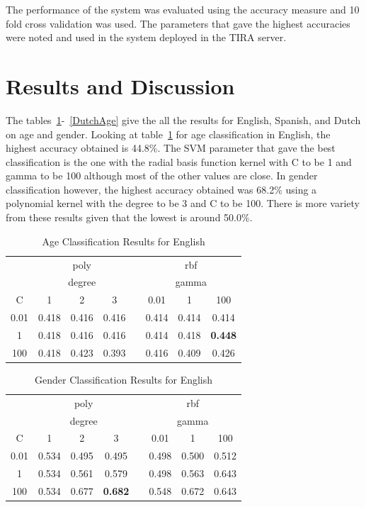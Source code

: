 \documentclass{llncs}
\begin{document}
The performance of the system was evaluated using the accuracy measure and 10 fold cross validation was used. The parameters that gave the highest accuracies were noted and used in the system deployed in the TIRA server. 

\section{Results and Discussion}
The tables~\ref{EnglishAge}-~\ref{DutchAge} give the all the results for English, Spanish, and Dutch on age and gender. Looking at table~\ref{EnglishAge} for age classification in English, the highest accuracy obtained is 44.8\%. The SVM parameter that gave the best classification is the one with the radial basis function kernel with C to be 1 and gamma to be 100 although most of the other values are close. In gender classification however, the highest accuracy obtained was 68.2\% using a polynomial kernel with the degree to be 3 and C to be 100. There is more variety from these results given that the lowest is around 50.0\%.
\begin{table}[!htbp]
\centering
\caption{Age Classification Results for English}
\label{EnglishAge}
\begin{tabular}{cccccccc}
\toprule
     & \multicolumn{3}{c}{poly}   &  & \multicolumn{3}{c}{rbf}        \\
     & \multicolumn{3}{c}{degree} &  & \multicolumn{3}{c}{gamma}      \\
C    & 1       & 2       & 3      &  & 0.01  & 1     & 100            \\
\midrule
0.01 & 0.418   & 0.416   & 0.416  &  & 0.414 & 0.414 & 0.414          \\
1    & 0.418   & 0.416   & 0.416  &  & 0.414 & 0.418 & \textbf{0.448} \\
100  & 0.418   & 0.423   & 0.393  &  & 0.416 & 0.409 & 0.426         \\
\bottomrule 
\end{tabular}
\end{table}

\begin{table}[!htbp]
\centering
\caption{Gender Classification Results for English}
\label{EnglishGender}
\begin{tabular}{cccccccc}
\toprule
     & \multicolumn{3}{c}{poly}       &  & \multicolumn{3}{c}{rbf}   \\
     & \multicolumn{3}{c}{degree}     &  & \multicolumn{3}{c}{gamma} \\
C    & 1     & 2     & 3              &  & 0.01    & 1       & 100   \\
\midrule
0.01 & 0.534 & 0.495 & 0.495          &  & 0.498   & 0.500   & 0.512 \\
1    & 0.534 & 0.561 & 0.579          &  & 0.498   & 0.563   & 0.643 \\
100  & 0.534 & 0.677 & \textbf{0.682} &  & 0.548   & 0.672   & 0.643 \\
\bottomrule
\end{tabular}
\end{table}
\end{document}
